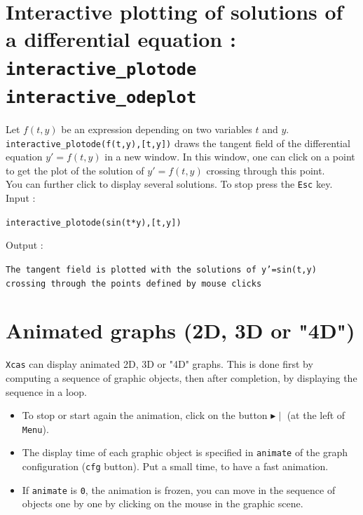 \documentclass[a4paper,11pt]{book}
\begin{document}
\section{Interactive plotting of solutions of a differential equation : {\tt interactive\_plotode interactive\_odeplot}}
\noindent Let $f(t,y)$ be an expression depending on two 
variables $t$ and $y$.\\
{\tt interactive\_plotode(f(t,y),[t,y])} draws the tangent field
of the differential equation $y'=f(t,y)$ in a new window. 
In this window, one can click on a point to get the 
plot of the solution of $y'=f(t,y)$ crossing through this point.\\
You can further click to display 
several solutions. To stop  press
the {\tt Esc} key.\\
Input :
\begin{center}{\tt interactive\_plotode(sin(t*y),[t,y]) }\end{center}
Output :
\begin{center}{\tt The tangent field is plotted with the
    solutions of y'=sin(t,y) crossing through the points defined by
     mouse clicks}\end{center}

\section{Animated graphs (2D, 3D or "4D")}
{\tt Xcas} can display animated 2D, 3D or "4D" graphs. 
This is done first by computing
a sequence of graphic objects, then after completion,
by displaying the sequence in a loop.
\begin{itemize} 
\item To stop or start again the animation, click on the button 
$\blacktriangleright \mid$ (at the left of {\tt Menu}).
\item
The display time of each graphic object is specified in {\tt animate} of the
graph configuration ({\tt cfg} button). Put a small time, 
to have a fast animation.
\item
If {\tt animate} is {\tt 0}, the animation is frozen,
you can move in the sequence of objects one by one by clicking
on the mouse in the graphic scene.
\end{itemize}
\end{document}
